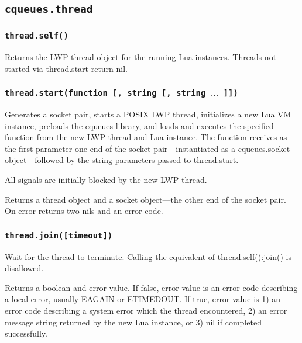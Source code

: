 \documentclass[11pt, oneside]{memoir}
\newcommand*{\fn}[1]{\texttt{#1}\xspace}
\newcommand*{\module}[1]{\texttt{#1}\xspace}
\begin{document}
\subsection{\module{cqueues.thread}}

\subsubsection[\fn{thread.self}]{\fn{thread.self()}}
Returns the LWP thread object for the running Lua instances. Threads not started via thread.start return nil.

\subsubsection[\fn{thread.start}]{\fn{thread.start(function [, string [, string $\ldots$ ]])}}
Generates a socket pair, starts a POSIX LWP thread, initializes a new Lua VM instance, preloads the cqueues library, and loads and executes the specified function from the new LWP thread and Lua instance. The function receives as the first parameter one end of the socket pair---instantiated as a cqueues.socket object---followed by the string parameters passed to thread.start.

All signals are initially blocked by the new LWP thread.

Returns a thread object and a socket object---the other end of the socket pair. On error returns two nils and an error code.

\subsubsection[\fn{thread:join}]{\fn{thread.join([timeout])}}
Wait for the thread to terminate. Calling the equivalent of thread.self():join() is disallowed.

Returns a boolean and error value. If false, error value is an error code describing a local error, usually EAGAIN or ETIMEDOUT. If true, error value is 1) an error code describing a system error which the thread encountered, 2) an error message string returned by the new Lua instance, or 3) nil if completed successfully.


\appendix
\printindex
\end{document}

